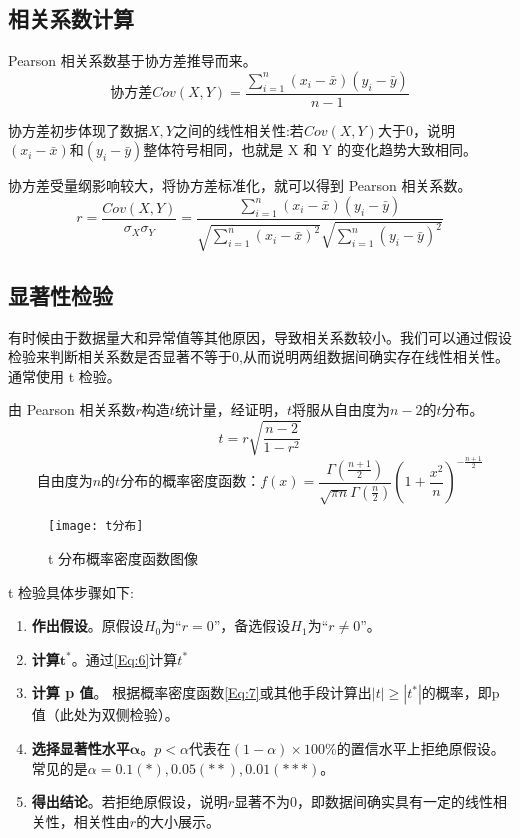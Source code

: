\documentclass[withoutpreface]{cumcmthesis}
\begin{document}
\subsection{相关系数计算}

Pearson 相关系数基于协方差推导而来。
\begin{equation}
    \mbox{协方差} Cov(X,Y) = \frac{\sum\limits_{i=1}^{n} (x_i-\bar x)(y_i-\bar y)}{n-1}
\end{equation}

协方差初步体现了数据$X,Y$之间的线性相关性:若$Cov(X,Y)$大于0，说明$(x_i-\bar x)$和$(y_i-\bar y)$整体符号相同，也就是 X 和 Y 的变化趋势大致相同。

协方差受量纲影响较大，将协方差标准化，就可以得到 Pearson 相关系数。
\begin{equation}
    r = \frac{Cov(X,Y)}{\sigma_X\sigma_Y} = \frac{\sum\limits_{i=1}^{n} (x_i-\bar x)(y_i-\bar y)}{\sqrt{\sum\limits_{i=1}^{n}(x_i - \bar x)^2} \sqrt{\sum\limits_{i=1}^{n}(y_i - \bar y)^2}}
\end{equation}

\subsection{显著性检验}

有时候由于数据量大和异常值等其他原因，导致相关系数较小。我们可以通过假设检验来判断相关系数是否显著不等于0,从而说明两组数据间确实存在线性相关性。通常使用 t 检验。

由 Pearson 相关系数$r$构造$t$统计量，经证明，$t$将服从自由度为$n-2$的$t$分布。
\begin{equation}\label{Eq:6}
    t = r\sqrt{\frac{n-2}{1-r^2}}
\end{equation}
\begin{equation}\label{Eq:7}
    \mbox{自由度为$n$的$t$分布的概率密度函数：}f(x)=\frac{\Gamma(\frac{n+1}{2})}{\sqrt{\pi n}\Gamma(\frac{n}{2})}(1+\frac{x^2}{n})^{-\frac{n+1}{2}}
\end{equation}

\begin{figure}[H]
    \centering
    \texttt{[image: t分布]}
    \caption{t 分布概率密度函数图像}\label{Fig:4}
\end{figure}

t 检验具体步骤如下:

\begin{enumerate}
    \item \textbf{作出假设}。原假设$H_0$为“$r=0$”，备选假设$H_1$为“$r\ne 0$”。
    \item \textbf{计算}$\mathbf{t^*}$。通过\cref{Eq:6}计算$t^*$
    \item \textbf{计算 p 值}。 根据概率密度函数\cref{Eq:7}或其他手段计算出$|t|\ge |t^*|$的概率，即p值（此处为双侧检验）。
    \item \textbf{选择显著性水平}$\mathbf{\alpha}$。$p<\alpha$代表在$(1-\alpha)\times 100\%$的置信水平上拒绝原假设。常见的是$\alpha=0.1(*),0.05(**),0.01(***)$。
    \item \textbf{得出结论}。若拒绝原假设，说明$r$显著不为0，即数据间确实具有一定的线性相关性，相关性由$r$的大小展示。
\end{enumerate}
\end{document}
